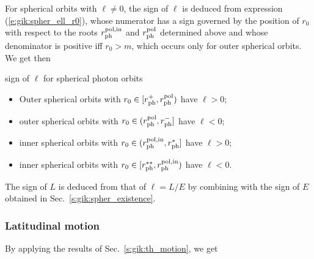 For spherical orbits with $\ell\neq 0$,
the sign of $\ell$ is deduced from expression (\ref{e:gik:spher_ell_r0}),
whose numerator has a sign governed by the position of $r_0$ with respect to the
roots $r_{\rm ph}^{\rm pol,in}$ and $r_{\rm ph}^{\rm pol}$ determined above and whose denominator is positive iff $r_0 > m$, which occurs
only for outer spherical orbits. We get then
\begin{tprop}{sign of $\ell$ for spherical photon orbits}{}
\begin{itemize}
\item Outer spherical orbits with $r_0 \in [r_{\rm ph}^+, r_{\rm ph}^{\rm pol})$ %
have $\ell > 0$;
\item outer spherical orbits with $r_0 \in (r_{\rm ph}^{\rm pol}, r_{\rm ph}^-]$ %
have $\ell < 0$;
\item inner spherical orbits with $r_0 \in (r_{\rm ph}^{\rm pol,in}, r_{\rm ph}^*]$
have $\ell > 0$;
\item inner spherical orbits with $r_0 \in [r_{\rm ph}^{**}, r_{\rm ph}^{\rm pol,in})$ %
have $\ell < 0$.
\end{itemize}
\end{tprop}
The sign of $L$ is deduced from that of $\ell = L/E$ by combining with the sign of $E$ obtained
in Sec.~\ref{s:gik:spher_existence}.

\subsubsection{Latitudinal motion}

By applying the results of Sec.~\ref{s:gik:th_motion}, we get

